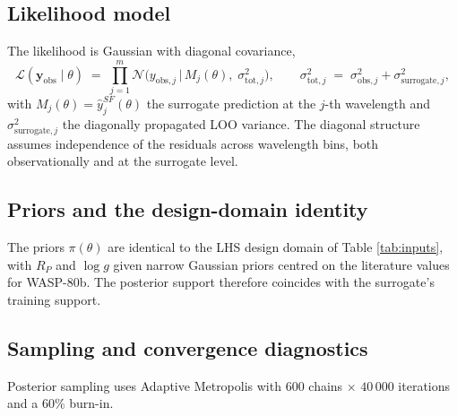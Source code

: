 \documentclass[11pt,a4paper]{article}
\newcommand{\researchq}[1]{%
  \par\smallskip\noindent
  \textbf{\textcolor{blue}{Research question.}}\,\textit{#1}\par\smallskip}
\newcommand{\yv}{\bm{y}}
\newcommand{\Rp}{R_{\!P}}
\newcommand{\logg}{\log g}
\begin{document}

\subsection{Likelihood model}
\label{sec:likelihood}
The likelihood is Gaussian with diagonal covariance,
\[
\mathcal{L}(\yv_{\mathrm{obs}} \mid \theta) \;=\;
\prod_{j=1}^{m}
\mathcal{N}\!\bigl(y_{\mathrm{obs},j}\,\big\vert\,
M_{j}(\theta),\;
\sigma^{2}_{\mathrm{tot},j}\bigr),
\qquad
\sigma^{2}_{\mathrm{tot},j} \;=\;
\sigma^{2}_{\mathrm{obs},j} + \sigma^{2}_{\mathrm{surrogate},j},
\]
with $M_{j}(\theta) = \hat y^{SF}_{j}(\theta)$ the surrogate prediction
at the $j$-th wavelength and $\sigma^{2}_{\mathrm{surrogate},j}$ the
diagonally propagated LOO variance. The diagonal structure assumes
independence of the residuals across wavelength bins, both
observationally and at the surrogate level.

\subsection{Priors and the design-domain identity}
The priors $\pi(\theta)$ are identical to the LHS design domain of
Table \ref{tab:inputs}, with $\Rp$ and $\logg$ given narrow Gaussian priors centred
on the literature values for WASP-80b. The posterior support therefore coincides with the surrogate's training support. 



\subsection{Sampling and convergence diagnostics}
Posterior sampling uses Adaptive Metropolis with $600$ chains $\times$ $40\,000$ iterations and a
$60\%$ burn-in. 

\end{document}
